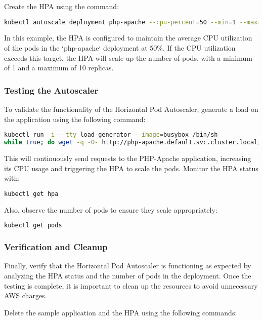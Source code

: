 Create the HPA using the command:

\begin{lstlisting}[language=bash]
kubectl autoscale deployment php-apache --cpu-percent=50 --min=1 --max=10
\end{lstlisting}

In this example, the HPA is configured to maintain the average CPU utilization of the pods in the `php-apache` deployment at 50\%. If the CPU utilization exceeds this target, the HPA will scale up the number of pods, with a minimum of 1 and a maximum of 10 replicas.

\subsubsection{Testing the Autoscaler}

To validate the functionality of the Horizontal Pod Autoscaler, generate a load on the application using the following command:

\begin{lstlisting}[language=bash]
kubectl run -i --tty load-generator --image=busybox /bin/sh
while true; do wget -q -O- http://php-apache.default.svc.cluster.local; done
\end{lstlisting}

This will continuously send requests to the PHP-Apache application, increasing its CPU usage and triggering the HPA to scale the pods. Monitor the HPA status with:

\begin{lstlisting}[language=bash]
kubectl get hpa
\end{lstlisting}

Also, observe the number of pods to ensure they scale appropriately:

\begin{lstlisting}[language=bash]
kubectl get pods
\end{lstlisting}

\subsubsection{Verification and Cleanup}

Finally, verify that the Horizontal Pod Autoscaler is functioning as expected by analyzing the HPA status and the number of pods in the deployment. Once the testing is complete, it is important to clean up the resources to avoid unnecessary AWS charges.

Delete the sample application and the HPA using the following commands:


